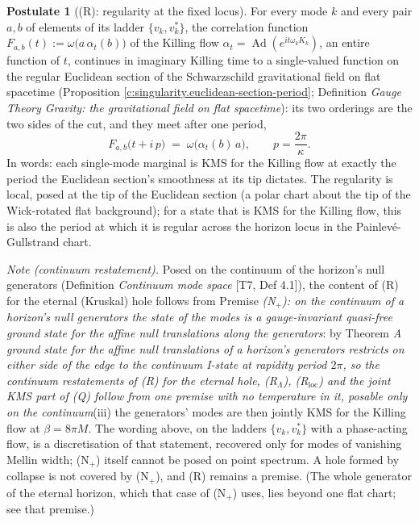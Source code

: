 \documentclass[11pt]{article}
\theoremstyle{definition}
\newtheorem{postulate}[theorem]{Postulate}
\theoremstyle{plain}
\begin{document}
\begin{postulate}[(R): regularity at the fixed locus]\label{c:singularity.r-regularity-fixed-locus}
For every mode $k$ and every pair $a, b$ of elements of its ladder $\{v_k, v_k^{*}\}$, the correlation function $F_{a,b}(t) := \omega\bigl(a\,\alpha_t(b)\bigr)$ of the Killing flow $\alpha_t = \operatorname{Ad}(e^{it\omega_k K_k})$, an entire function of $t$, continues in imaginary Killing time to a single-valued function on the regular Euclidean section of the Schwarzschild gravitational field on flat spacetime (Proposition \ref{c:singularity.euclidean-section-period}; Definition \emph{Gauge Theory Gravity: the gravitational field on flat spacetime}): its two orderings are the two sides of the cut, and they meet after one period,
\[
F_{a,b}\bigl(t + i\,p\bigr) \;=\; \omega\bigl(\alpha_t(b)\,a\bigr), \qquad p = \frac{2\pi}{\kappa} .
\]
In words: each single-mode marginal is KMS for the Killing flow at exactly the period the Euclidean section's smoothness at its tip dictates. The regularity is local, posed at the tip of the Euclidean section (a polar chart about the tip of the Wick-rotated flat background); for a state that is KMS for the Killing flow, this is also the period at which it is regular across the horizon locus in the Painlev\'e-Gullstrand chart.

\emph{Note (continuum restatement).} Posed on the continuum of the horizon's null generators (Definition \emph{Continuum mode space} [T7, Def 4.1]), the content of (R) for the eternal (Kruskal) hole follows from Premise \emph{(N$_{+}$): on the continuum of a horizon's null generators the state of the modes is a gauge-invariant quasi-free ground state for the affine null translations along the generators}: by Theorem \emph{A ground state for the affine null translations of a horizon's generators restricts on either side of the edge to the continuum I-state at rapidity period $2\pi$, so the continuum restatements of (R) for the eternal hole, (R$_{\Lambda}$), (R$_{\mathrm{loc}}$) and the joint KMS part of (Q) follow from one premise with no temperature in it, posable only on the continuum}(iii) the generators' modes are then jointly KMS for the Killing flow at $\beta = 8\pi M$. The wording above, on the ladders $\{v_{k}, v_{k}^{*}\}$ with a phase-acting flow, is a discretisation of that statement, recovered only for modes of vanishing Mellin width; (N$_{+}$) itself cannot be posed on point spectrum. A hole formed by collapse is not covered by (N$_{+}$), and (R) remains a premise. (The whole generator of the eternal horizon, which that case of (N$_{+}$) uses, lies beyond one flat chart; see that premise.)
\end{postulate}
\end{document}
